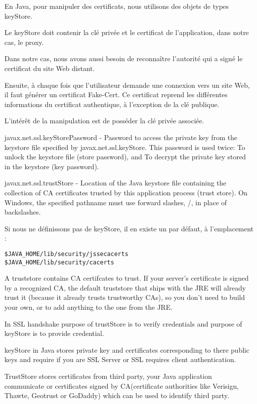 En Java, pour manipuler des certificats, nous utilisons des objets de types keyStore.

Le keyStore doit contenir la clé privée et le certificat de l'application, dans notre cas, le proxy.

Dans notre cas, nous avons aussi besoin de reconnaître l'autorité qui a signé le certificat du site Web distant.

Ensuite, à chaque fois que l'utilisateur demande une connexion vers un site Web, il faut générer un certificat Fake-Cert. Ce certificat reprend les différentes informations du certificat authentique, à l'exception de la clé publique.

L'intérêt de la manipulation est de posséder la clé privée associée.

javax.net.ssl.keyStorePassword - Password to access the private key from the keystore file specified by javax.net.ssl.keyStore. This password is used twice: To unlock the keystore file (store password), and To decrypt the private key stored in the keystore (key password).

javax.net.ssl.trustStore - Location of the Java keystore file containing the collection of CA certificates trusted by this application process (trust store). On Windows, the specified pathname must use forward slashes, /, in place of backslashes.

Si nous ne définissons pas de keyStore, il en existe un par défaut, à l'emplacement :
\begin{verbatim}
$JAVA_HOME/lib/security/jssecacerts
$JAVA_HOME/lib/security/cacerts
\end{verbatim}


A truststore contains CA certifcates to trust. If your server’s certificate is signed by a recognized CA, the default truststore that ships with the JRE will already trust it (because it already trusts trustworthy CAs), so you don’t need to build your own, or to add anything to the one from the JRE.







In SSL handshake purpose of trustStore is to verify credentials and purpose of keyStore is to provide credential.

keyStore in Java stores private key and certificates corresponding to there public keys and require if you are SSL Server or SSL requires client authentication.

TrustStore stores certificates from third party, your Java application communicate or certificates signed by CA(certificate authorities like Verisign, Thawte, Geotrust or GoDaddy) which can be used to identify third party.

